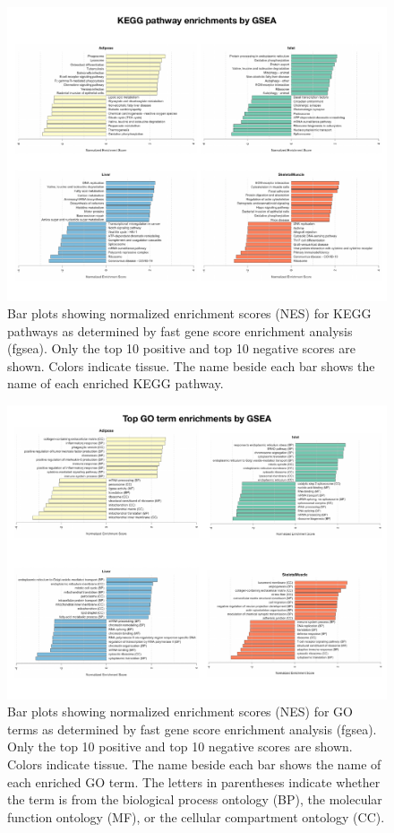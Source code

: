 \documentclass[
]{article}
\begin{document}
\begin{figure}[ht!]
\includegraphics[width=\textwidth]{Figures/Supp_Fig_enrichments_KEGG.pdf} 
\caption{Bar plots showing normalized enrichment scores (NES) for KEGG 
pathways as determined by fast gene score enrichment analysis (fgsea). 
Only the top 10 positive and top 10 negative scores are shown. Colors 
indicate tissue. The name beside each bar shows the name of each enriched 
KEGG pathway.
}
\label{fig:top_enrich_kegg}
\end{figure}

\begin{figure}[ht!]
\includegraphics[width=\textwidth]{Figures/Supp_Fig_enrichments_GO.pdf} 
\caption{Bar plots showing normalized enrichment scores (NES) for GO 
terms as determined by fast gene score enrichment analysis (fgsea). 
Only the top 10 positive and top 10 negative scores are shown. Colors 
indicate tissue. The name beside each bar shows the name of each enriched 
GO term. The letters in parentheses indicate whether the term is from the 
biological process ontology (BP), the molecular function ontology (MF), 
or the cellular compartment ontology (CC).
}
\label{fig:top_enrich_go}
\end{figure}
\end{document}
